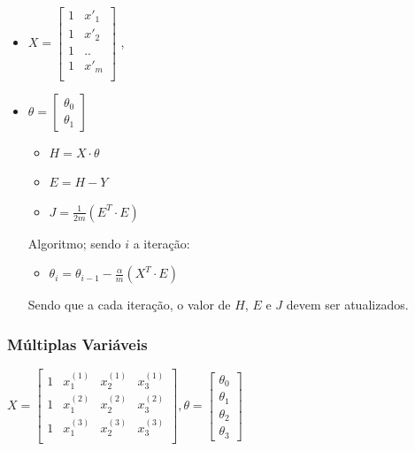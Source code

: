 \documentclass[12pt]{article}
\providecommand{\tightlist}{%
      \setlength{\itemsep}{0pt}\setlength{\parskip}{0pt}}
\begin{document}
\begin{itemize}
\tightlist
\item
  \(X=\begin{bmatrix}  1 & x'_1 \\  1 & x'_2 \\  1 & .. \\  1 & x'_m \\  \end{bmatrix}\)
  ,
\item
  \(\theta=\begin{bmatrix}  \theta_0\\  \theta_1  \end{bmatrix}\)

  \begin{itemize}
  \tightlist
  \item
    \(H=X \cdot \theta\)
  \item
    \(E=H - Y\)
  \item
    \(J=\frac{1}{2m}(E^T \cdot E)\)
  \end{itemize}

  Algoritmo; sendo \(i\) a iteração:

  \begin{itemize}
  \tightlist
  \item
    \(\theta_i=\theta_{i-1} - \frac{\alpha}{m}(X^T \cdot E)\)
  \end{itemize}

  Sendo que a cada iteração, o valor de \(H\), \(E\) e \(J\) devem ser
  atualizados.
\end{itemize}

\hypertarget{muxfaltiplas-variuxe1veis}{%
\subsubsection{Múltiplas Variáveis}\label{muxfaltiplas-variuxe1veis}}

\(X=\begin{bmatrix} 1 & x^{(1)}_1 & x^{(1)}_2 & x^{(1)}_3 \\ 1 & x^{(2)}_1 & x^{(2)}_2 & x^{(2)}_3 \\ 1 & x^{(3)}_1 & x^{(3)}_2 & x^{(3)}_3 \\ \end{bmatrix}, \theta=\begin{bmatrix} \theta_0 \\ \theta_1 \\ \theta_2 \\ \theta_3 \end{bmatrix}\)
\end{document}
